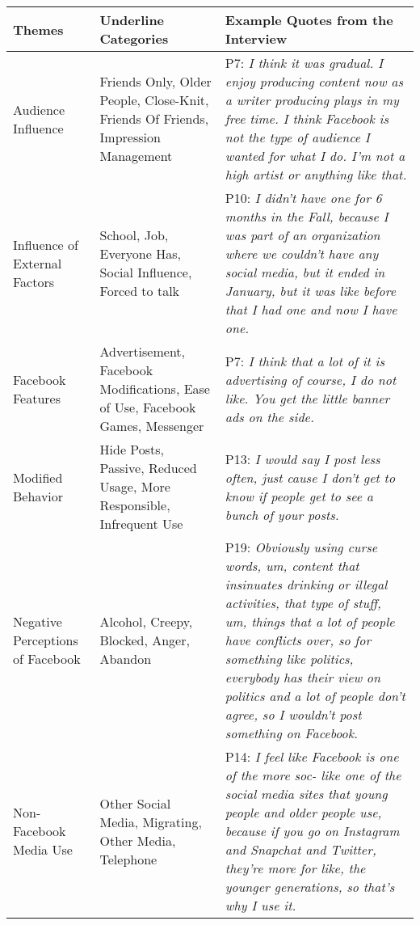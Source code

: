 \begin{table*}[htb!]
\begin{tabular}{ |p{2cm}||p{3cm}|p{8cm}| }
 \hline
 Themes & Underline Categories & Example Quotes from the Interview\\
 \hline \hline
 Audience Influence & Friends Only, Older People, Close-Knit, Friends Of Friends, Impression Management&P7: \textit{I think it was gradual. I enjoy producing content now as a writer producing plays in my free time. I think Facebook is not the type of audience I wanted for what I do. I'm not a high artist or anything like that.}\\
 \hline
 Influence of External Factors &School, Job, Everyone Has, Social Influence, Forced to talk& P10: \textit{I didn't have one for 6 months in the Fall, because I was part of an organization where we couldn't have any social media, but it ended in January, but it was like before that I had one and now I have one.} \\
 \hline
 Facebook Features &Advertisement, Facebook Modifications, Ease of Use, Facebook Games, Messenger& P7: \textit{I think that a lot of it is advertising of course, I do not like. You get the little banner ads on the side.}\\
 \hline
 Modified Behavior & Hide Posts, Passive, Reduced Usage, More Responsible, Infrequent Use& P13: \textit{I would say I post less often, just cause I don't get to know if people get to see a bunch of your posts.} \\
 \hline
 Negative Perceptions of Facebook    & Alcohol, Creepy, Blocked, Anger, Abandon&P19: \textit{Obviously using curse words, um, content that insinuates drinking or illegal activities, that type of stuff, um, things that a lot of people have conflicts over, so for something like politics, everybody has their view on politics and a lot of people don't agree, so I wouldn't post something on Facebook.}  \\
 \hline
 Non-Facebook Media Use   & Other Social Media, Migrating, Other Media, Telephone& P14: \textit{I feel like Facebook is one of the more soc- like one of the social media sites that young people and older people use, because if you go on Instagram and Snapchat and Twitter, they're more for like, the younger generations, so that's why I use it.}\\

\end{tabular}
\end{table*}
